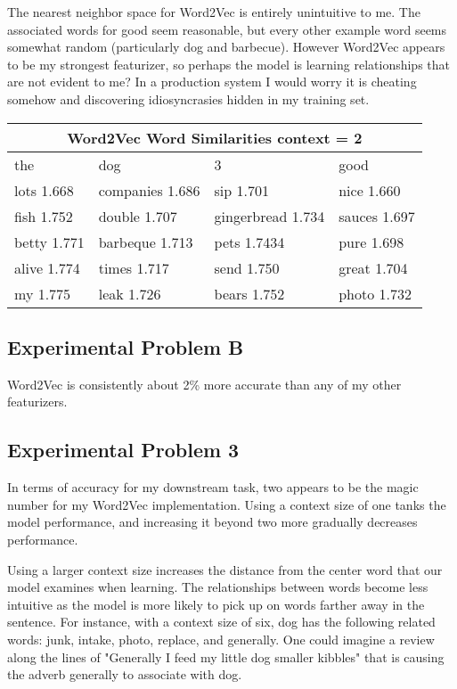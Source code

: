 The nearest neighbor space for Word2Vec is entirely unintuitive to me. The associated words for good seem reasonable, but every other example word seems somewhat random (particularly dog and barbecue). However Word2Vec appears to be my strongest featurizer, so perhaps the model is learning relationships that are not evident to me? In a production system I would worry it is cheating somehow and discovering idiosyncrasies hidden in my training set.

\begin{tabular}{ |p{3cm}|p{3cm}|p{4cm}|p{3cm}|  }
    \hline
    \multicolumn{4}{|c|}{Word2Vec Word Similarities context  = 2}    \\
    \hline
    the         & dog             & 3                 & good         \\
    \hline
    lots 1.668  & companies 1.686 & sip 1.701         & nice 1.660   \\
    fish 1.752  & double 1.707    & gingerbread 1.734 & sauces 1.697 \\
    betty 1.771 & barbeque 1.713  & pets 1.7434       & pure 1.698   \\
    alive 1.774 & times 1.717     & send 1.750        & great 1.704  \\
    my 1.775    & leak 1.726      & bears 1.752       & photo 1.732  \\
    \hline
\end{tabular}
\subsection*{Experimental Problem B}
Word2Vec is consistently about 2\% more accurate than any of my other featurizers.

\subsection*{Experimental Problem 3}
In terms of accuracy for my downstream task, two appears to be the magic number for my Word2Vec implementation. Using a context size of one tanks the model performance, and increasing it beyond two more gradually decreases performance.

Using a larger context size increases the distance from the center word that our model examines when learning. The relationships between words become less intuitive as the model is more likely to pick up on words farther away in the sentence. For instance, with a context size of six, dog has the following related words: junk, intake, photo, replace, and generally. One could imagine a review along the lines of "Generally I feed my little dog smaller kibbles" that is causing the adverb generally to associate with dog.



